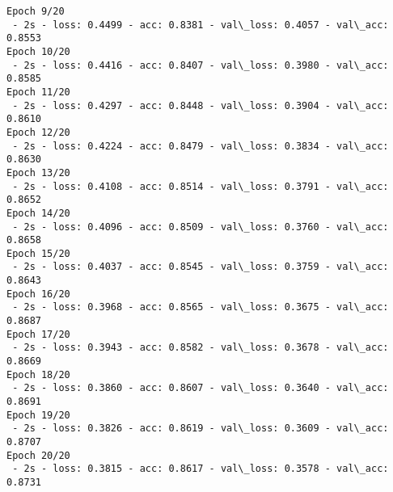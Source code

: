 \documentclass[11pt]{article}
\begin{document}
\begin{Verbatim}[commandchars=\\\{\}]
Epoch 9/20
 - 2s - loss: 0.4499 - acc: 0.8381 - val\_loss: 0.4057 - val\_acc: 0.8553
Epoch 10/20
 - 2s - loss: 0.4416 - acc: 0.8407 - val\_loss: 0.3980 - val\_acc: 0.8585
Epoch 11/20
 - 2s - loss: 0.4297 - acc: 0.8448 - val\_loss: 0.3904 - val\_acc: 0.8610
Epoch 12/20
 - 2s - loss: 0.4224 - acc: 0.8479 - val\_loss: 0.3834 - val\_acc: 0.8630
Epoch 13/20
 - 2s - loss: 0.4108 - acc: 0.8514 - val\_loss: 0.3791 - val\_acc: 0.8652
Epoch 14/20
 - 2s - loss: 0.4096 - acc: 0.8509 - val\_loss: 0.3760 - val\_acc: 0.8658
Epoch 15/20
 - 2s - loss: 0.4037 - acc: 0.8545 - val\_loss: 0.3759 - val\_acc: 0.8643
Epoch 16/20
 - 2s - loss: 0.3968 - acc: 0.8565 - val\_loss: 0.3675 - val\_acc: 0.8687
Epoch 17/20
 - 2s - loss: 0.3943 - acc: 0.8582 - val\_loss: 0.3678 - val\_acc: 0.8669
Epoch 18/20
 - 2s - loss: 0.3860 - acc: 0.8607 - val\_loss: 0.3640 - val\_acc: 0.8691
Epoch 19/20
 - 2s - loss: 0.3826 - acc: 0.8619 - val\_loss: 0.3609 - val\_acc: 0.8707
Epoch 20/20
 - 2s - loss: 0.3815 - acc: 0.8617 - val\_loss: 0.3578 - val\_acc: 0.8731

    \end{Verbatim}
\end{document}
